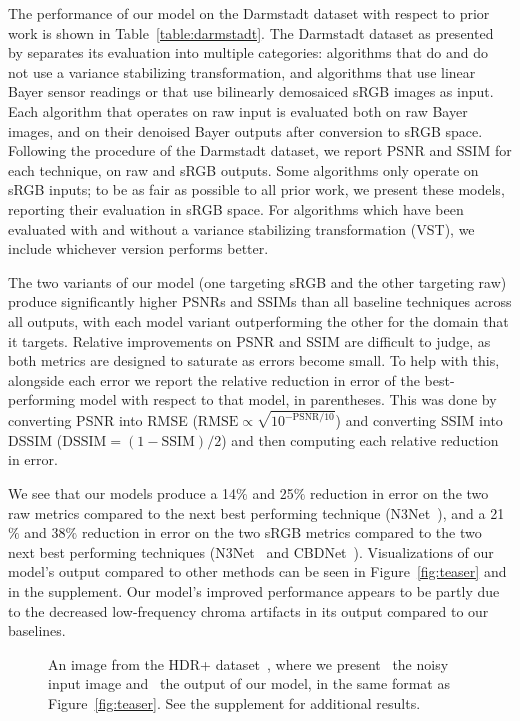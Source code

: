 \documentclass[10pt,twocolumn,letterpaper]{article}
\begin{document}
The performance of our model on the Darmstadt dataset with respect to prior work is shown in Table~\ref{table:darmstadt}. The Darmstadt dataset as presented by \cite{plotz2017cvpr} separates its evaluation into multiple categories: algorithms that do and do not use a variance stabilizing transformation, and algorithms that use linear Bayer sensor readings or that use bilinearly demosaiced sRGB images as input. Each algorithm that operates on raw input is evaluated both on raw Bayer images, and on their denoised Bayer outputs after conversion to sRGB space. Following the procedure of the Darmstadt dataset, we report PSNR and SSIM for each technique, on raw and sRGB outputs. Some algorithms only operate on sRGB inputs; to be as fair as possible to all prior work, we present these models, reporting their evaluation in sRGB space. For algorithms which have been evaluated with and without a variance stabilizing transformation (VST), we include whichever version performs better.

The two variants of our model (one targeting sRGB and the other targeting raw) produce significantly higher PSNRs and SSIMs than all baseline techniques across all outputs, with each model variant outperforming the other for the domain that it targets.
Relative improvements on PSNR and SSIM are difficult to judge, as both metrics are designed to saturate as errors become small. To help with this, alongside each error we report the relative reduction in error of the best-performing model with respect to that model, in parentheses. This was done by converting PSNR into RMSE ($\textrm{RMSE} \propto \sqrt{10^{-\textrm{PSNR}/10}}$) and converting SSIM into DSSIM ($\textrm{DSSIM} = (1 - \textrm{SSIM})/2$) and then computing each relative reduction in error.

We see that our models produce a 14$\%$ and 25$\%$ reduction in error on the two raw metrics compared to the next best performing technique (N3Net~\cite{NNN}), and a 21$\%$ and 38$\%$ reduction in error on the two sRGB metrics compared to the two next best performing techniques (N3Net~\cite{NNN} and CBDNet~\cite{CBDnet}). Visualizations of our model's output compared to other methods can be seen in Figure~\ref{fig:teaser} and in the supplement.
Our model's improved performance appears to be partly due to the decreased low-frequency chroma artifacts in its output compared to our baselines.

\begin{figure}[t]
\begin{center}
\end{center}
  \caption{An image from the HDR+ dataset~\cite{hasinoff2016burst}, where we present ~the noisy input image and ~the output of our model, in the same format as Figure~\ref{fig:teaser}.
  See the supplement for additional results.}
\label{fig:hdrp}
\end{figure}
\end{document}
